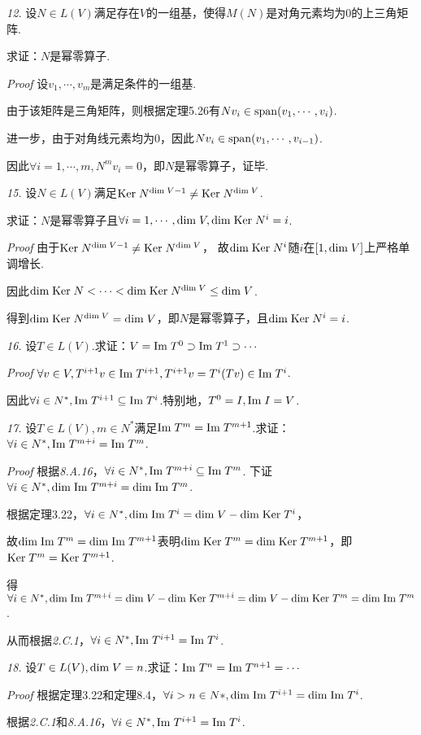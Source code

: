 \newpage

\textit{12.}
设\(N \in L(V)\)满足存在\(V\)的一组基，使得\(M(N)\)是对角元素均为\(0\)的上三角矩阵.

求证：\(N\)是幂零算子.

\textit{Proof}
设\(v_1,\cdots,v_m\)是满足条件的一组基.

由于该矩阵是三角矩阵，则根据定理5.26有\(Nv_i \in \mathrm{span} (v_1,\cdots,v_i)\).

进一步，由于对角线元素均为\(0\)，因此\(Nv_i \in \mathrm{span} (v_1,\cdots,v_{i-1})\).

因此\(\forall i=1,\cdots,m,N^m v_i=0\)，即\(N\)是幂零算子，证毕.

\hspace*{\fill}

\textit{15.}
设\(N \in L(V)\)满足\(\mathrm{Ker \;} N^{\mathrm{dim \;} V-1} \ne \mathrm{Ker \;} N^{\mathrm{dim \;} V}\).

求证：\(N\)是幂零算子且\(\forall i=1,\cdots,\mathrm{dim \;} V,\mathrm{dim \;} \mathrm{Ker \;} N^i=i\).

\textit{Proof}
由于\(\mathrm{Ker \;} N^{\mathrm{dim \;} V-1} \ne \mathrm{Ker \;} N^{\mathrm{dim \;} V}\)，
故\(\mathrm{dim \;} \mathrm{Ker \;} N^i\)随\(i\)在\([1,\mathrm{dim \;} V]\)上严格单调增长.

因此\(\mathrm{dim \;} \mathrm{Ker \;} N<\cdots<\mathrm{dim \;} \mathrm{Ker \;} N^{\mathrm{dim \;} V} \leq \mathrm{dim \;} V\).

得到\(\mathrm{dim \;} \mathrm{Ker \;} N^{\mathrm{dim \;} V}=\mathrm{dim \;} V\)，即\(N\)是幂零算子，且\(\mathrm{dim \;} \mathrm{Ker \;} N^i=i\).

\hspace*{\fill}

\textit{16.}
设\(T \in L(V)\).求证：\(V=\mathrm{Im \;} T^0 \supset \mathrm{Im \;} T^1 \supset \cdots\)

\textit{Proof}
\(\forall v \in V,T^{i+1}v \in \mathrm{Im \;} T^{i+1},T^{i+1}v=T^i(Tv) \in \mathrm{Im \;} T^i\).

因此\(\forall i \in N^*,\mathrm{Im \;} T^{i+1} \subseteq \mathrm{Im \;} T^i\).特别地，\(T^0=I,\mathrm{Im \;} I=V\).

\hspace*{\fill}

\textit{17.}
设\(T \in L(V),m \in N^*\)满足\(\mathrm{Im \;} T^m=\mathrm{Im \;} T^{m+1}\).求证：\(\forall i \in N^*,\mathrm{Im \;} T^{m+i}=\mathrm{Im \;} T^m\).

\textit{Proof}
根据\textit{8.A.16}，\(\forall i \in N^*,\mathrm{Im \;} T^{m+i} \subseteq \mathrm{Im \;} T^m\).
下证\(\forall i \in N^*,\mathrm{dim \;} \mathrm{Im \;} T^{m+i}=\mathrm{dim \;} \mathrm{Im \;} T^m\).

根据定理3.22，\(\forall i \in N^*,\mathrm{dim \;} \mathrm{Im \;} T^i=\mathrm{dim \;} V-\mathrm{dim \;} \mathrm{Ker \;} T^i\)，

故\(\mathrm{dim \;} \mathrm{Im \;} T^m=\mathrm{dim \;} \mathrm{Im \;} T^{m+1}\)表明\(\mathrm{dim \;} \mathrm{Ker \;} T^m=\mathrm{dim \;} \mathrm{Ker \;} T^{m+1}\)，即\(\mathrm{Ker \;} T^m =\mathrm{Ker \;} T^{m+1}\).

得\(\forall i \in N^*,\mathrm{dim \;} \mathrm{Im \;} T^{m+i}=\mathrm{dim \;} V-\mathrm{dim \;} \mathrm{Ker \;} T^{m+i}=\mathrm{dim \;} V-\mathrm{dim \;} \mathrm{Ker \;} T^m=\mathrm{dim \;} \mathrm{Im \;} T^m\).

从而根据\textit{2.C.1}，\(\forall i \in N^*,\mathrm{Im \;} T^{i+1}=\mathrm{Im \;} T^i\).

\hspace*{\fill}

\textit{18.}
设\(T \in L(V),\mathrm{dim \;} V=n\).求证：\(\mathrm{Im \;} T^n=\mathrm{Im \;} T^{n+1}=\cdots\)

\textit{Proof}
根据定理3.22和定理8.4，\(\forall i>n \in N*,\mathrm{dim \;} \mathrm{Im \;} T^{i+1}=\mathrm{dim \;} \mathrm{Im \;} T^i\).

根据\textit{2.C.1}和\textit{8.A.16}，\(\forall i \in N^*,\mathrm{Im \;} T^{i+1}=\mathrm{Im \;} T^i\).

